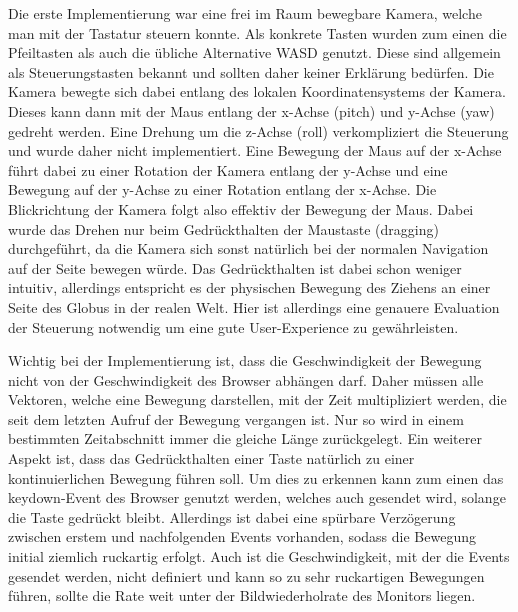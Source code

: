 Die erste Implementierung war eine frei im Raum bewegbare Kamera, welche man mit der Tastatur steuern konnte. Als konkrete Tasten wurden zum einen die Pfeiltasten als auch die übliche Alternative WASD genutzt. Diese sind allgemein als Steuerungstasten bekannt und sollten daher keiner Erklärung bedürfen. Die Kamera bewegte sich dabei entlang des lokalen Koordinatensystems der Kamera. Dieses kann dann mit der Maus entlang der x-Achse (pitch) und y-Achse (yaw) gedreht werden. Eine Drehung um die z-Achse (roll) verkompliziert die Steuerung und wurde daher nicht implementiert. Eine Bewegung der Maus auf der x-Achse führt dabei zu einer Rotation der Kamera entlang der y-Achse und eine Bewegung auf der y-Achse zu einer Rotation entlang der x-Achse. Die Blickrichtung der Kamera folgt also effektiv der Bewegung der Maus. Dabei wurde das Drehen nur beim Gedrückthalten der Maustaste (dragging) durchgeführt, da die Kamera sich sonst natürlich bei der normalen Navigation auf der Seite bewegen würde. Das Gedrückthalten ist dabei schon weniger intuitiv, allerdings entspricht es der physischen Bewegung des Ziehens an einer Seite des Globus in der realen Welt. Hier ist allerdings eine genauere Evaluation der Steuerung notwendig um eine gute User-Experience zu gewährleisten.

Wichtig bei der Implementierung ist, dass die Geschwindigkeit der Bewegung nicht von der Geschwindigkeit des Browser abhängen darf. Daher müssen alle Vektoren, welche eine Bewegung darstellen, mit der Zeit multipliziert werden, die seit dem letzten Aufruf der Bewegung vergangen ist. Nur so wird in einem bestimmten Zeitabschnitt immer die gleiche Länge zurückgelegt. Ein weiterer Aspekt ist, dass das Gedrückthalten einer Taste natürlich zu einer kontinuierlichen Bewegung führen soll. Um dies zu erkennen kann zum einen das keydown-Event des Browser genutzt werden, welches auch gesendet wird, solange die Taste gedrückt bleibt. Allerdings ist dabei eine spürbare Verzögerung zwischen erstem und nachfolgenden Events vorhanden, sodass die Bewegung initial ziemlich ruckartig erfolgt. Auch ist die Geschwindigkeit, mit der die Events gesendet werden, nicht definiert und kann so zu sehr ruckartigen Bewegungen führen, sollte die Rate weit unter der Bildwiederholrate des Monitors liegen. 


